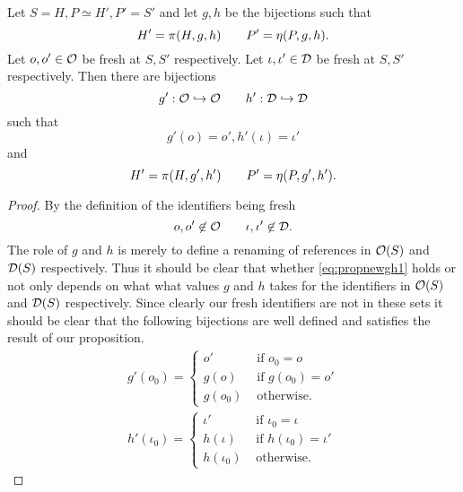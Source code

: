 \begin{proposition}
  Let $S = H, P \simeq H', P' = S'$ and let $g, h$ be the bijections such that
  \begin{equation} \label{eq:propnewgh1}
    H' = \pi(H, g, h) \quad\quad P' = \eta(P, g, h).
  \end{equation}
  Let $o, o' \in \mathcal{O}$ be fresh at $S, S'$ respectively.
  Let $\iota, \iota' \in \mathcal{D}$ be fresh at $S, S'$ respectively.
  Then there are bijections
  \begin{equation*}
    g': \mathcal{O} \hookrightarrow \mathcal{O} \quad\quad h': \mathcal{D} \hookrightarrow \mathcal{D}
  \end{equation*}
  such that 
  \begin{equation} \label{eq:propnewgh2}
    g'(o) = o', h'(\iota) = \iota'
  \end{equation} 
  and
  \begin{equation} \label{eq:propnewgh3}
    H' = \pi(H, g', h') \quad\quad P' = \eta(P, g', h').
  \end{equation}
\end{proposition}

\begin{proof}
  By the definition of the identifiers being fresh
  \begin{equation*}
    o, o' \not\in \mathcal{O} \quad\quad \iota, \iota' \not\in \mathcal{D}.
  \end{equation*}
  The role of $g$ and $h$ is merely to define a renaming of references in
  $\mathcal{O}(S)$ and $\mathcal{D}(S)$ respectively. Thus it should be clear that whether
  \eqref{eq:propnewgh1} holds or not only depends on what what values
  $g$ and $h$ takes for the identifiers in $\mathcal{O}(S)$ and $\mathcal{D}(S)$
  respectively. Since clearly our fresh identifiers are not in these sets it should
  be clear that the following bijections are well defined and satisfies the
  result of our proposition.
  \begin{equation*}
    \begin{gathered}
      g'(o_{0}) =
      \begin{cases}
        o' & \text{ if } o_0 = o \\
        g(o) &\text{ if } g(o_0) = o' \\
        g(o_{0}) & \text{ otherwise.} 
      \end{cases} \\
      h'(\iota_0) =
      \begin{cases}
        \iota' & \text{ if } \iota_0 = \iota \\
        h(\iota) & \text{ if } h(\iota_0) = \iota' \\
        h(\iota_0) & \text{ otherwise.} 
      \end{cases}
    \end{gathered}
  \end{equation*}
\end{proof}

